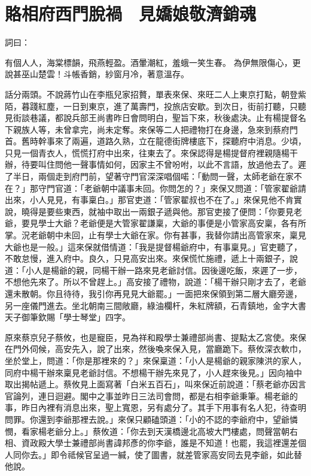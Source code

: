 %

\chapter{賂相府西門脫禍　見嬌娘敬濟銷魂}

詞曰：

有個人人，海棠標韻，飛燕輕盈。酒暈潮紅，羞蛾一笑生春。
為伊無限傷心，更說甚巫山楚雲！斗帳香銷，紗窗月冷，著意溫存。

話分兩頭。不說蔣竹山在李瓶兒家招贅，單表來保、來旺二人上東京打點，朝登紫陌，暮踐紅塵，一日到東京，進了萬壽門，投旅店安歇。到次日，街前打聽，只聽見街談巷議，都說兵部王尚書昨日會問明白，聖旨下來，秋後處決。止有楊提督名下親族人等，未曾拿完，尚未定奪。來保等二人把禮物打在身邊，急來到蔡府門首。舊時幹事來了兩遍，道路久熟，立在龍德街牌樓底下，探聽府中消息。少頃，只見一個青衣人，慌慌打府中出來，往東去了。來保認得是楊提督府裡親隨楊干辦，待要叫住問他一聲事情如何，因家主不曾吩咐，以此不言語，放過他去了。遲了半日，兩個走到府門前，望著守門官深深唱個喏：「動問一聲，太師老爺在家不在？」那守門官道：「老爺朝中議事未回。你問怎的？」來保又問道：「管家翟爺請出來，小人見見，有事稟白。」那官吏道：「管家翟叔也不在了。」來保見他不肯實說，曉得是要些東西，就袖中取出一兩銀子遞與他。那官吏接了便問：「你要見老爺，要見學士大爺？老爺便是大管家翟謙稟，大爺的事便是小管家高安稟，各有所掌。況老爺朝中未回，止有學士大爺在家。你有甚事，我替你請出高管家來，稟見大爺也是一般。」這來保就借情道：「我是提督楊爺府中，有事稟見。」官吏聽了，不敢怠慢，進入府中。良久，只見高安出來。來保慌忙施禮，遞上十兩銀子，說道：「小人是楊爺的親，同楊干辦一路來見老爺討信。因後邊吃飯，來遲了一步，不想他先來了。所以不曾趕上。」高安接了禮物，說道：「楊干辦只剛才去了，老爺還未散朝。你且待待，我引你再見見大爺罷。」一面把來保領到第二層大廳旁邊，另一座儀門進去。坐北朝南三間敞廳，綠油欄杆，朱紅牌額，石青鎮地，金字大書天子御筆欽賜「學士琴堂」四字。

原來蔡京兒子蔡攸，也是寵臣，見為祥和殿學士兼禮部尚書、提點太乙宮使。來保在門外伺候，高安先入，說了出來，然後喚來保入見，當廳跪下。蔡攸深衣軟巾，坐於堂上，問道：「你是那裡來的？」來保稟道：「小人是楊爺的親家陳洪的家人，同府中楊干辦來稟見老爺討信。不想楊干辦先來見了，小人趕來後見。」因向袖中取出揭帖遞上。蔡攸見上面寫著「白米五百石」，叫來保近前說道：「蔡老爺亦因言官論列，連日迴避。閣中之事並昨日三法司會問，都是右相李爺秉筆。楊老爺的事，昨日內裡有消息出來，聖上寬恩，另有處分了。其手下用事有名人犯，待查明問罪。你還到李爺那裡去說。」來保只顧磕頭道：「小的不認的李爺府中，望爺憐憫，看家楊老爺分上。」蔡攸道：「你去到天漢橋邊北高坡大門樓處，問聲當朝右相、資政殿大學士兼禮部尚書諱邦彥的你李爺，誰是不知道！也罷，我這裡還差個人同你去。」即令祗候官呈過一緘，使了圖書，就差管家高安同去見李爺，如此替他說。

